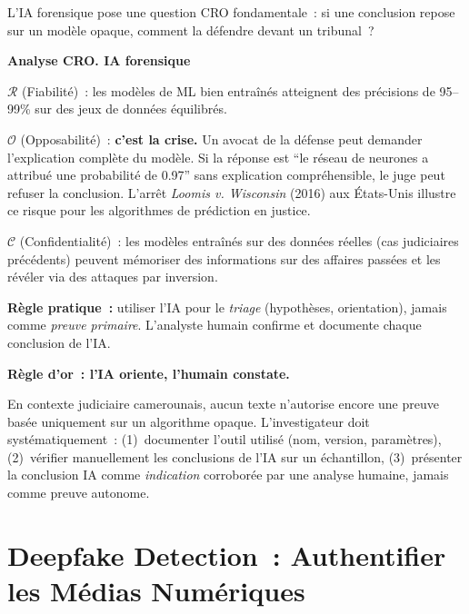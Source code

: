 L'IA forensique pose une question CRO fondamentale~: si une conclusion
repose sur un modèle opaque, comment la défendre devant un tribunal~?

\begin{boxCRO}
\textbf{Analyse CRO. IA forensique}

$\mathcal{R}$ (Fiabilité)~: les modèles de ML bien entraînés atteignent
des précisions de 95--99\% sur des jeux de données équilibrés.

$\mathcal{O}$ (Opposabilité)~: \textbf{c'est la crise.} Un avocat de la
défense peut demander l'explication complète du modèle. Si la réponse
est ``le réseau de neurones a attribué une probabilité de 0.97''
sans explication compréhensible, le juge peut refuser la conclusion.
L'arrêt \textit{Loomis v. Wisconsin} (2016) aux États-Unis illustre
ce risque pour les algorithmes de prédiction en justice.

$\mathcal{C}$ (Confidentialité)~: les modèles entraînés sur des données
réelles (cas judiciaires précédents) peuvent mémoriser des informations
sur des affaires passées et les révéler via des attaques par inversion.


\textbf{Règle pratique~:} utiliser l'IA pour le \emph{triage} (hypothèses,
orientation), jamais comme \emph{preuve primaire}. L'analyste humain
confirme et documente chaque conclusion de l'IA.
\end{boxCRO}

\begin{boxalert}
\textbf{Règle d'or~: l'IA oriente, l'humain constate.}

En contexte judiciaire camerounais, aucun texte n'autorise encore une
preuve basée uniquement sur un algorithme opaque. L'investigateur doit
systématiquement~: (1)~documenter l'outil utilisé (nom, version,
paramètres), (2)~vérifier manuellement les conclusions de l'IA sur un
échantillon, (3)~présenter la conclusion IA comme \emph{indication}
corroborée par une analyse humaine, jamais comme preuve autonome.
\end{boxalert}

\section{Deepfake Detection~: Authentifier les Médias Numériques}
\label{sec:deepfakes}

